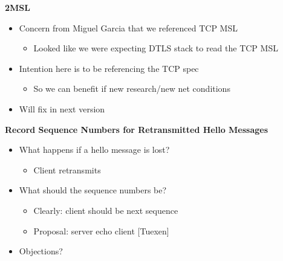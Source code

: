 \documentclass[helvetica]{seminar}
\newcommand{\heading}[1]{%
  \begin{center} 
    \large\bf 
    #1 
  \end{center} 
  \vspace{.4 in}}
\begin{document}


\begin{slide}
\heading{2MSL}

\begin{itemize}
\item Concern from Miguel Garcia that we referenced TCP MSL
  \begin{itemize}
  \item Looked like we were expecting DTLS stack to read the TCP MSL
  \end{itemize}

\item Intention here is to be referencing the TCP spec
  \begin{itemize}
  \item So we can benefit if new research/new net conditions
  \end{itemize}

\item Will fix in next version

\end{itemize}
\end{slide}


\begin{slide}
\heading{Record Sequence Numbers for Retransmitted Hello Messages}

\begin{itemize}
\item What happens if a hello message is lost?
  \begin{itemize}
  \item Client retransmits
  \end{itemize}

\item What should the sequence numbers be?
  \begin{itemize}
  \item Clearly: client should be next sequence
  \item Proposal: server echo client [Tuexen]
  \end{itemize}

\item Objections?
\end{itemize}

\end{slide}
\end{document}
